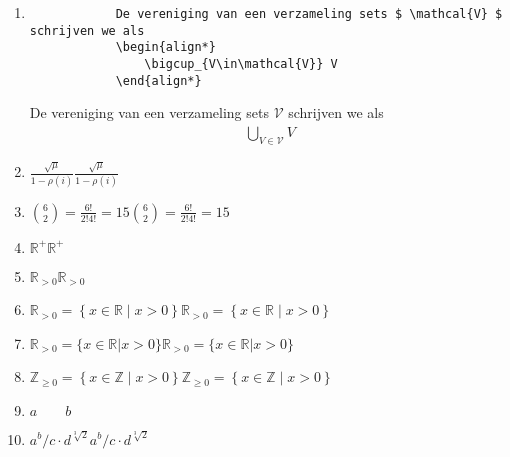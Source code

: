 \documentclass{article}
\newenvironment{demobox}{
    \begin{adjustbox}{frame=1pt 10pt}%
        \begin{minipage}{\linewidth-22pt}
}{
        \end{minipage}
    \end{adjustbox}
}
\begin{document}
\begin{enumerate}
\begin{verbatim}
        \end{verbatim}
        \begin{demobox}
            Het product van $ x_i $ schrijven we als
            \begin{align*}
                \prod_{i=0}^{\infty} x_i.
            \end{align*}
        \end{demobox}
        \item \begin{verbatim}
            De vereniging van een verzameling sets $ \mathcal{V} $ schrijven we als
            \begin{align*}
                \bigcup_{V\in\mathcal{V}} V
            \end{align*}
        \end{verbatim}
        \begin{demobox}
            De vereniging van een verzameling sets $ \mathcal{V} $ schrijven we als
            \begin{align*}
                \bigcup_{V\in\mathcal{V}} V
            \end{align*}
        \end{demobox}
        \item \texttt{$ \frac{\sqrt{\mu}}{1-\rho(i)} $}\qquad $ \frac{\sqrt{\mu}}{1-\rho(i)} $
        \item \texttt{$ \binom{6}{2} = \frac{6!}{2!4!} = 15 $}\qquad $ \binom{6}{2} = \frac{6!}{2!4!} = 15 $
        \item \texttt{$ \mathbb{R}^{+} $}\qquad $ \mathbb{R}^{+} $
        \item \texttt{$ \mathbb{R}_{>0} $}\qquad $ \mathbb{R}_{>0} $
        \item \texttt{$ \mathbb{R}_{>0} = \left\{x\in\mathbb{R}\mid x > 0\right\} $}\qquad $ \mathbb{R}_{>0} = \left\{x\in\mathbb{R}\mid x > 0\right\} $
        \item \texttt{$ \mathbb{R}_{>0} = \{x\in\mathbb{R} | x > 0\} $}\qquad $ \mathbb{R}_{>0} = \{x\in\mathbb{R} | x > 0\} $
        \item \texttt{$ \mathbb{Z}_{\geq 0} = \left\{x\in\mathbb{Z}\mid x > 0\right\} $}\qquad $ \mathbb{Z}_{\geq 0} = \left\{x\in\mathbb{Z}\mid x > 0\right\} $
        \item \texttt{$ a\qquad b $}
        \item \texttt{$ a^b/c\cdot d^{\sqrt[3]{2}} $}\qquad $ a^b/c\cdot d^{\sqrt[3]{2}} $

\end{enumerate}
\end{document}
